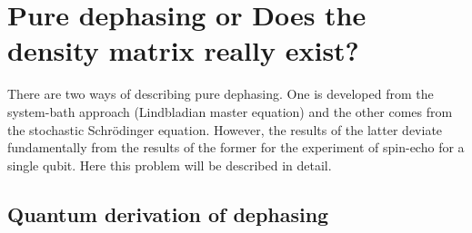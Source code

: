 \documentclass[12pt, twoside]{report}
\numberwithin{equation}{section}
\begin{document}
\appendix

\chapter{Pure dephasing or Does the density matrix really exist?}

There are two ways of describing pure dephasing. One is developed from the system-bath approach (Lindbladian master equation) and the other comes from the stochastic Schrödinger equation. However, the results of the latter deviate fundamentally from the results of the former for the experiment of spin-echo for a single qubit. Here this problem will be described in detail.

\section{Quantum derivation of dephasing}
\end{document}

